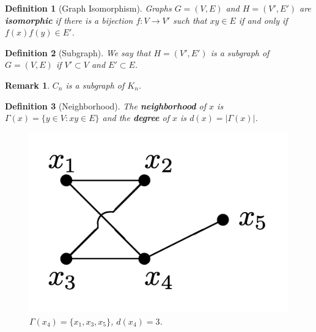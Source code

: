 \documentclass[cm,linguex]{glossa}
\theoremstyle{defn}
\newtheorem{defn}{Definition}
\theoremstyle{axiom}
\theoremstyle{thm}
\theoremstyle{lem}
\theoremstyle{cor}
\theoremstyle{prop}
\theoremstyle{rmk}
\newtheorem*{rmk}{Remark}
\begin{document}
\begin{defn}[Graph Isomorphism]
Graphs $G = (V, E)$ and $H = (V', E')$ are \textbf{isomorphic} if there is a bijection $f : V \to V'$ such that $xy \in E$ if and only if $f(x)f(y) \in E'$.
\end{defn}

\begin{defn}[Subgraph]
We say that $H = (V', E')$ is a subgraph of $G = (V, E)$ if $V' \subset V$ and $E' \subset E$.
\end{defn}

\begin{rmk}
$C_n$ is a subgraph of $K_n$.
\end{rmk}

\begin{defn}[Neighborhood]
The \textbf{neighborhood} of $x$ is $\Gamma(x) = \{ y \in V : xy \in E \}$ and the \textbf{degree} of $x$ is $d(x) = \lvert \Gamma(x) \rvert$.

\begin{figure}[H]
\centering
\includegraphics[scale=0.4]{fig/1.png}
\caption{$\Gamma(x_4) = \{x_1, x_3, x_5\}$, $d(x_4) = 3$.}
\end{figure}
\end{defn}
\end{document}
